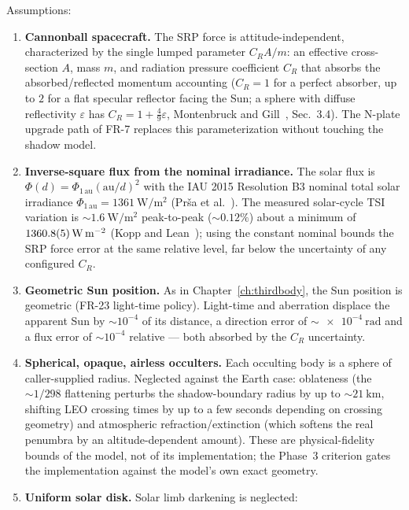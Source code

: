 Assumptions:
\begin{enumerate}
  \item \textbf{Cannonball spacecraft.} The SRP force is
    attitude-independent, characterized by the single lumped parameter
    $C_R A / m$: an effective cross-section $A$, mass $m$, and radiation
    pressure coefficient $C_R$ that absorbs the absorbed/reflected
    momentum accounting ($C_R = 1$ for a perfect absorber, up to $2$ for
    a flat specular reflector facing the Sun; a sphere with diffuse
    reflectivity $\varepsilon$ has $C_R = 1 + \tfrac{4}{9}\varepsilon$,
    Montenbruck and Gill~\cite{montenbruck2000}, Sec.~3.4). The N-plate
    upgrade path of FR-7 replaces this parameterization without touching
    the shadow model.
  \item \textbf{Inverse-square flux from the nominal irradiance.} The
    solar flux is $\Phi(d) = \Phi_{1\,\mathrm{au}} (\mathrm{au}/d)^{2}$
    with the IAU 2015 Resolution B3 nominal total solar irradiance
    $\Phi_{1\,\mathrm{au}} = \qty{1361}{\watt\per\metre\squared}$ (Pr{\v s}a
    et al.~\cite{prsa2016}). The measured solar-cycle TSI variation is
    $\sim \qty{1.6}{\watt\per\metre\squared}$ peak-to-peak
    ($\sim 0.12\%$) about a minimum of
    $\qty{1360.8 \pm 0.5}{\watt\per\metre\squared}$ (Kopp and
    Lean~\cite{kopp2011}); using the constant nominal bounds the SRP
    force error at the same relative level, far below the uncertainty of
    any configured $C_R$.
  \item \textbf{Geometric Sun position.} As in
    Chapter~\ref{ch:thirdbody}, the Sun position is geometric (FR-23
    light-time policy). Light-time and aberration displace the apparent
    Sun by $\sim 10^{-4}$ of its distance, a direction error of
    $\sim \qty{e-4}{\radian}$ and a flux error of $\sim 10^{-4}$
    relative --- both absorbed by the $C_R$ uncertainty.
  \item \textbf{Spherical, opaque, airless occulters.} Each occulting
    body is a sphere of caller-supplied radius. Neglected against the
    Earth case: oblateness (the $\sim 1/298$ flattening perturbs the
    shadow-boundary radius by up to $\sim \qty{21}{\kilo\metre}$,
    shifting LEO crossing times by up to a few seconds depending on
    crossing geometry) and atmospheric refraction/extinction (which
    softens the real penumbra by an altitude-dependent amount). These
    are physical-fidelity bounds of the model, not of its
    implementation; the Phase~3 criterion gates the implementation
    against the model's own exact geometry.
  \item \textbf{Uniform solar disk.} Solar limb darkening is neglected:

\end{enumerate}
